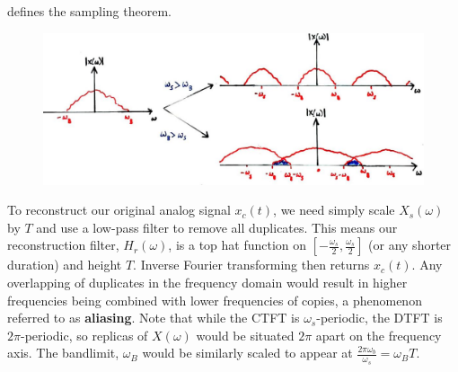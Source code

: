 defines the sampling theorem.\\
%
\begin{figure}[H]
  \includegraphics[width=\textwidth]{images/lecture_13_nyquist.JPG}
  \caption{
  }
  \label{fig::lecture_13_nyquist}
\end{figure}
%
To reconstruct our original analog signal $x_c(t)$, we need simply scale
$X_s(\omega)$ by $T$ and use a low-pass filter to remove all duplicates.
This means our reconstruction filter, $H_r(\omega)$, is a top hat function
on $\left[-\frac{\omega_s}{2},\frac{\omega_s}{2}\right]$ (or any shorter
duration) and height $T$. Inverse Fourier transforming then returns $x_c(t)$.
Any overlapping of duplicates in the frequency domain would result in higher
frequencies being combined with lower frequencies of copies, a phenomenon
referred to as \textbf{aliasing}. Note that while the CTFT is
$\omega_s$-periodic, the DTFT is $2\pi$-periodic, so replicas of $X(\omega)$
would be situated $2\pi$ apart on the frequency axis. The bandlimit, $\omega_B$
would be similarly scaled to appear at $\frac{2\pi\omega_b}{\omega_s} = \omega_B T$.\\

